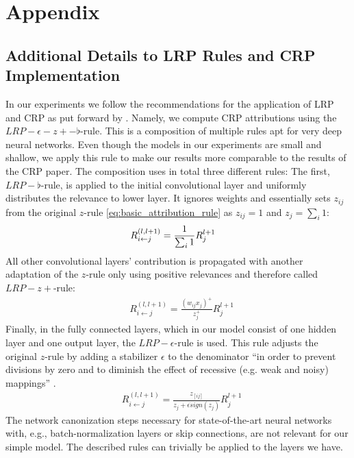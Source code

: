 \chapter{Appendix}\label{chapter:Appendix}

\section{Additional Details to LRP Rules and CRP Implementation}
\label{appendix:lrprules}
In our experiments we follow the recommendations for the application of LRP and CRP as put forward by \cite{Bach2015, Kohlbrenner2020, Montavon2019, Samek2021}. Namely, we compute CRP attributions using the $LRP-\epsilon-z+-\flat$-rule. This is a composition of multiple rules apt for very deep neural networks. Even though the models in our experiments are small and shallow, we apply this rule to make our results more comparable to the results of the CRP paper. The composition uses in total three different rules: The first, $LRP-\flat$-rule, is applied to the initial convolutional layer and uniformly distributes the relevance to lower layer. It ignores weights and essentially sets $z_{ij}$ from the original $z$-rule \cref{eq:basic_attribution_rule} as $z_{ij} = 1$ and $z_j = \sum_i 1$: 
\begin{align}\displaystyle
& R_{i\leftarrow j}^{(l, l+1)} = \frac{1}{\sum_{i}1} R_{j}^{l+1}
\end{align}
All other convolutional layers' contribution is propagated with another adaptation of the $z$-rule only using positive relevances and therefore called $LRP-z+$-rule:
\begin{align}
& R_{i\leftarrow j}^{(l, l+1)} = \frac{(w_{ij}x_j)^{+}}{z_{j}^+} R_{j}^{l+1}
\end{align}
Finally, in the fully connected layers, which in our model consist of one hidden layer and one output layer, the $LRP-\epsilon$-rule is used. This rule adjusts the original $z$-rule by adding a stabilizer $\epsilon$ to the denominator ``in order to prevent divisions by zero and to diminish the effect of recessive (e.g. weak and noisy) mappings'' \citep[][p. 2]{Kohlbrenner2020}. 
\begin{align}
& R_{i\leftarrow j}^{(l, l+1)} = \frac{z_[ij]}{z_{j} + \epsilon \dot sign(z_j)} R_{j}^{l+1}
\end{align}
The network canonization steps necessary for state-of-the-art neural networks with, e.g., batch-normalization layers or skip connections, are not relevant for our simple model. The described rules can trivially be applied to the layers we have. 

